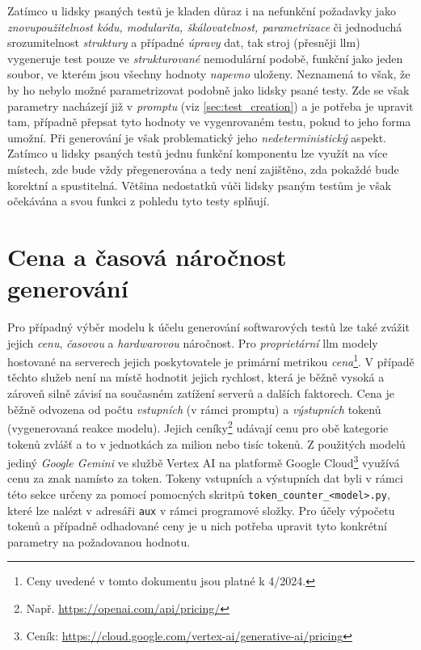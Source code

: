 \documentclass[czech, ma, kiv, he, iso690alph, pdf, viewonly]{fasthesis}
\begin{document}
        Zatímco u lidsky psaných testů je kladen důraz i na nefunkční požadavky jako \textit{znovupoužitelnost kódu, modularita, škálovatelnost, parametrizace} či jednoduchá srozumitelnost \textit{struktury} a případné \textit{úpravy} dat, tak stroj (přesněji \Gls{llm}) vygeneruje test pouze ve \textit{strukturované} nemodulární podobě, funkční jako jeden soubor, ve kterém jsou všechny hodnoty \textit{napevno} uloženy. Neznamená to však, že by ho nebylo možné parametrizovat podobně jako lidsky psané testy. Zde se však parametry nacházejí již v \emph{promptu} (viz \ref{sec:test_creation}) a je potřeba je upravit tam, případně přepsat tyto hodnoty ve vygenrovaném testu, pokud to jeho forma umožní. Při generování je však problematický jeho \textit{nedeterministický} aspekt. Zatímco u lidsky psaných testů jednu funkční komponentu lze využít na více místech, zde bude vždy přegenerována a tedy není zajištěno, zda pokaždé bude korektní a spustitelná. Většina nedostatků vůči lidsky psaným testům je však očekávána a svou funkci z pohledu  tyto testy splňují.

    \section{Cena a časová náročnost generování} \label{sec:price_and_requirements}

    Pro případný výběr modelu k účelu generování softwarových testů lze také zvážit jejich \textit{cenu}, \textit{časovou} a \textit{hardwarovou} náročnost. Pro \textit{proprietární} \Gls{llm} modely hostované na serverech jejich poskytovatele je primární metrikou \textit{cena}\footnote{Ceny uvedené v tomto dokumentu jsou platné k 4/2024.}. V případě těchto služeb není na místě hodnotit jejich rychlost, která je běžně vysoká a zároveň silně závisí na současném zatížení serverů a dalších faktorech. Cena je běžně odvozena od počtu \textit{vstupních} (v rámci promptu) a \textit{výstupních} tokenů (vygenerovaná reakce modelu). Jejich ceníky\footnote{Např. \url{https://openai.com/api/pricing/}} udávají cenu pro obě kategorie tokenů zvlášť a to v jednotkách za milion nebo tisíc tokenů. Z použitých modelů jediný \textit{Google Gemini} ve službě Vertex AI na platformě Google Cloud\footnote{Ceník: \url{https://cloud.google.com/vertex-ai/generative-ai/pricing}} využívá cenu za znak namísto za token. Tokeny vstupních a výstupních dat byli v rámci této sekce určeny za pomocí pomocných skritpů \verb|token_counter_<model>.py|, které lze nalézt v adresáři \verb|aux| v rámci programové složky. Pro účely výpočetu tokenů a případně odhadované ceny je u nich potřeba upravit tyto konkrétní parametry na požadovanou hodnotu.
\end{document}

